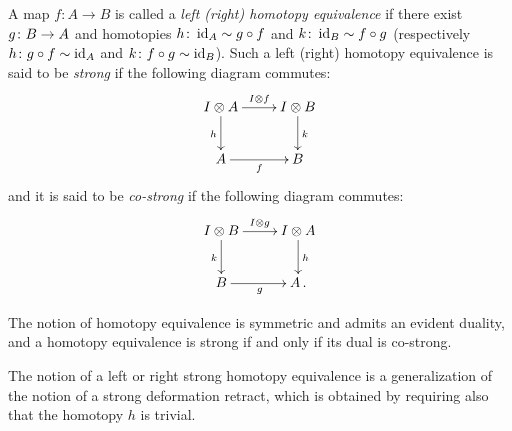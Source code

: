 \documentclass[reqno,10pt,a4paper,oneside]{amsart}
\begin{document}
\begin{definition}
\label{def:homotopy-equivalence}
A map $f : A \to B$ is called a \emph{left (right) homotopy equivalence} if there exist $g \colon B \to A$ and homotopies $h \colon \operatorname{id}_A \sim g \mathbin{\circ} f$ and $k \colon
\operatorname{id}_B \sim f \mathbin{\circ} g$ (respectively $h \colon g \mathbin{\circ} f \sim \operatorname{id}_A$ and $k \colon f \mathbin{\circ} g \sim \operatorname{id}_B$). Such a left (right) homotopy equivalence is said to be \emph{strong} if the
following diagram commutes:
\[
\xymatrix{
\interval \otimes A \ar[r]^{\interval \otimes f } \ar[d]_{h} & \interval \otimes B \ar[d]^{k} \\
A \ar[r]_{f} & B}
\]
and it is said to be \emph{co-strong} if  the following diagram commutes:
\[
\xymatrix{
\interval \otimes B \ar[r]^{\interval \otimes g } \ar[d]_{k} & \interval \otimes A \ar[d]^{h} \\
B \ar[r]_{g} & A \, .}
\]
%
\end{definition}

\begin{remark} The notion of homotopy equivalence is symmetric and admits an evident duality, and a homotopy equivalence is strong if 
and only if its dual is co-strong. 
\end{remark}


\begin{remark}
The notion of a left or right strong homotopy equivalence is a generalization of the notion of a strong deformation retract, which is obtained by requiring also
that the homotopy $h$ is trivial.
\end{remark} 
\end{document}

